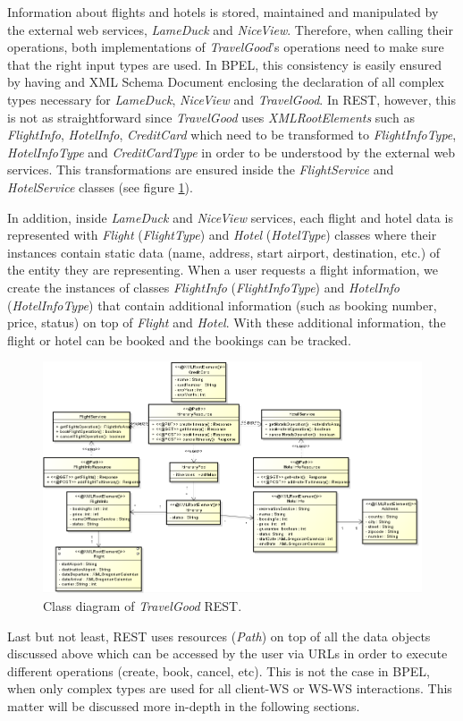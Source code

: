 Information about flights and hotels is stored, maintained and manipulated by the external web services, \textit{LameDuck} and \textit{NiceView}. Therefore, when calling their operations, both implementations of \textit{TravelGood}’s operations need to make sure that the right input types are used. In BPEL, this consistency is easily ensured by having and XML Schema Document enclosing the declaration of all complex types necessary for \textit{LameDuck}, \textit{NiceView} and \textit{TravelGood}. In REST, however, this is not as straightforward since \textit{TravelGood} uses \textit{XMLRootElements} such as \textit{FlightInfo}, \textit{HotelInfo}, \textit{CreditCard} which need to be transformed to \textit{FlightInfoType}, \textit{HotelInfoType} and \textit{CreditCardType} in order to be understood by the external web services. This transformations are ensured inside the \textit{FlightService} and \textit{HotelService} classes (see figure \ref{classdiagramREST}).

In addition, inside \textit{LameDuck} and \textit{NiceView} services, each flight and hotel data is represented with \textit{Flight} (\textit{FlightType}) and \textit{Hotel} (\textit{HotelType}) classes where their instances contain static data (name, address, start airport, destination, etc.) of the entity they are representing. When a user requests a flight information, we create the instances of classes \textit{FlightInfo} (\textit{FlightInfoType}) and \textit{HotelInfo} (\textit{HotelInfoType}) that contain additional information (such as booking number, price, status) on top of \textit{Flight} and \textit{Hotel}. With these additional information, the flight or hotel can be booked and the bookings can be tracked. 

\begin{figure}[H]
\centering
\includegraphics[width=\textwidth]{images/REST}
\caption{Class diagram of \textit{TravelGood} REST.}
\label{classdiagramREST}
\end{figure}

Last but not least, REST uses resources (\textit{\@ Path}) on top of all the data objects discussed above which can be accessed by the user via URLs in order to execute different operations (create, book, cancel, etc). This is not the case in BPEL, when only complex types are used for all client-WS or WS-WS interactions. This matter will be discussed more in-depth in the following sections.
